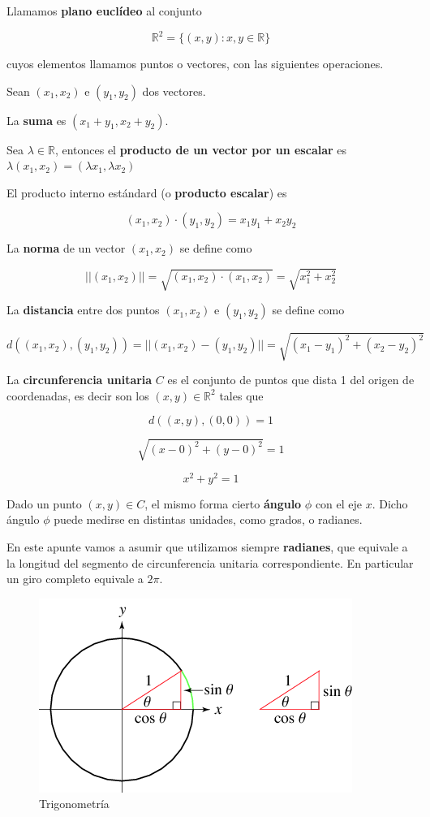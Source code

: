 \begin{definition} 

Llamamos \textbf{plano euclídeo} al conjunto

$$ \mathbb{R}^2 = \{ (x,y) : x, y \in \mathbb{R} \} $$

cuyos elementos llamamos puntos o vectores, con las siguientes operaciones.

Sean $(x_1,x_2)$ e $(y_1,y_2)$ dos vectores.

La \textbf{suma} es $(x_1+y_1, x_2+y_2)$.  

Sea $\lambda \in \mathbb{R}$, entonces el \textbf{producto de un vector por un escalar} es $\lambda(x_1,x_2) = (\lambda x_1, \lambda x_2)$

El producto interno estándard (o \textbf{producto escalar}) es

$$ (x_1,x_2) \cdot (y_1,y_2) = x_1 y_1 + x_2 y_2 $$

La \textbf{norma} de un vector $(x_1, x_2)$ se define como

$$ ||(x_1,x_2)|| = \sqrt{ (x_1, x_2) \cdot (x_1,x_2) } = \sqrt{x_1^2 + x_2^2} $$

La \textbf{distancia} entre dos puntos $(x_1,x_2)$ e $(y_1,y_2)$ se define como

$$ d((x_1,x_2), (y_1,y_2)) = ||(x_1,x_2) - (y_1,y_2) || = \sqrt{(x_1-y_1)^2 + (x_2-y_2)^2} $$

La \textbf{circunferencia unitaria} $C$ es el conjunto de puntos que dista 1 del origen de coordenadas, es decir son los $(x,y) \in \mathbb{R}^2$ tales que

$$ d((x,y),(0,0)) = 1 $$

$$ \sqrt{(x-0)^2 + (y-0)^2} = 1 $$

$$ x^2 + y^2 = 1 $$

Dado un punto $(x,y) \in C$, el mismo forma cierto \textbf{ángulo} $\phi$ con el eje $x$.  Dicho ángulo $\phi$ puede medirse en distintas unidades, como grados, o radianes.  

En este apunte vamos a asumir que utilizamos siempre \textbf{radianes}, que equivale a la longitud del segmento de circunferencia unitaria correspondiente.  En particular un giro completo equivale a $2\pi$.

\end{definition}

\begin{figure}[h]
\centering\includegraphics[scale=0.5]{images/01_precalculo/trigonometry.png}
\caption{Trigonometría}
\end{figure}

